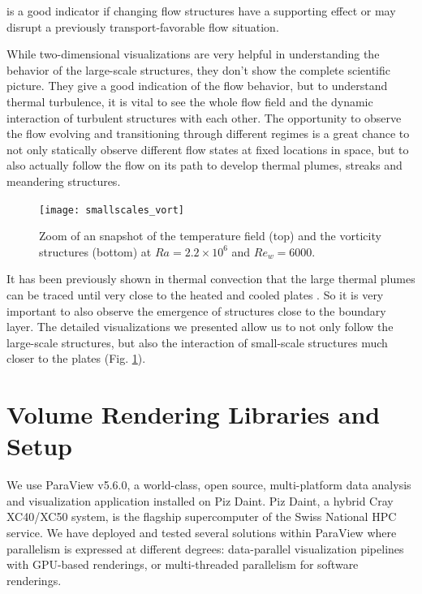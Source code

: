 \documentclass[5p,times]{elsarticle}
\begin{document}

is a good indicator if changing flow structures have a supporting effect or may disrupt a previously transport-favorable flow situation. 

While two-dimensional visualizations are very helpful in understanding the behavior of the large-scale structures, they don't show the complete scientific picture. They give a good indication of the flow behavior, but to understand thermal turbulence, it is vital to see the whole flow field and the dynamic interaction of turbulent structures with each other.
The opportunity to observe the flow evolving and transitioning through different regimes is a great chance to not only statically observe different flow states at fixed locations in space, but to also actually follow the flow on its path to develop thermal plumes, streaks and meandering structures.


\begin{figure}
	\centering
	\texttt{[image: smallscales\_vort]}%
	\caption{\label{fig:smallscale} Zoom of an snapshot of the temperature field (top) and the vorticity structures (bottom) at $ Ra=2.2 \times 10^6 $ and $ Re_w=6000 $.}
\end{figure}

It has been previously shown in thermal convection that the large thermal plumes can be traced until very close to the heated and cooled plates \cite{ste18}. So it is very important to also observe the emergence of structures close to the boundary layer. The detailed visualizations we presented allow us to not only follow the large-scale structures, but also the interaction of small-scale structures much closer to the plates (Fig. \ref{fig:smallscale}).\\

\section{Volume Rendering Libraries and Setup}

We use ParaView v5.6.0, a world-class, open source, multi-platform data analysis and
visualization application installed on Piz Daint. Piz Daint, a hybrid Cray XC40/XC50 system,
is the flagship supercomputer of the Swiss National HPC service. We have deployed
and tested several solutions within ParaView where parallelism is expressed
at different degrees: data-parallel visualization pipelines with GPU-based renderings,
or multi-threaded parallelism for software renderings.
\end{document}
